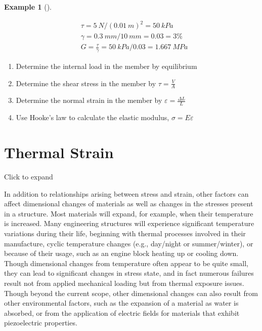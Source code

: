 \documentclass[
  letterpaper,
  DIV=11,
  numbers=noendperiod]{scrreprt}
\providecommand{\tightlist}{%
  \setlength{\itemsep}{0pt}\setlength{\parskip}{0pt}}\usepackage{longtable,booktabs,array}
\theoremstyle{definition}
\newtheorem{example}{Example}[chapter]
\theoremstyle{remark}
\begin{document}
\begin{tcolorbox}
\begin{example}[]
\begin{tcolorbox}
\[
\begin{aligned}
& \tau=5{~N} /(0.01{~m})^2=50{~kPa} \\
& \gamma=0.3{~mm}/10{~mm}=0.03=3 \% \\
& G=\frac{\tau}{\gamma}=50{~kPa}/0.03=1.667{~MPa}
\end{aligned}
\]

\end{tcolorbox}

\end{example}

\end{tcolorbox}

\begin{tcolorbox}[enhanced jigsaw, leftrule=.75mm, bottomrule=.15mm, opacityback=0, opacitybacktitle=0.6, colframe=quarto-callout-warning-color-frame, toprule=.15mm, colbacktitle=quarto-callout-warning-color!10!white, coltitle=black, bottomtitle=1mm, title={Step-by-step:}, titlerule=0mm, toptitle=1mm, colback=white, rightrule=.15mm, left=2mm, arc=.35mm, breakable]

\begin{enumerate}
\def\labelenumi{\arabic{enumi}.}
\tightlist
\item
  Determine the internal load in the member by equilibrium
\item
  Determine the shear stress in the member by \(\tau=\frac{V}{A}\)
\item
  Determine the normal strain in the member by
  \(\varepsilon=\frac{\Delta L}{L}\)
\item
  Use Hooke's law to calculate the elastic modulus,
  \(\sigma=E \varepsilon\)
\end{enumerate}

\end{tcolorbox}

\section{Thermal Strain}\label{sec-4.6}

Click to expand

In addition to relationships arising between stress and strain, other
factors can affect dimensional changes of materials as well as changes
in the stresses present in a structure. Most materials will expand, for
example, when their temperature is increased. Many engineering
structures will experience significant temperature variations during
their life, beginning with thermal processes involved in their
manufacture, cyclic temperature changes (e.g., day/night or
summer/winter), or because of their usage, such as an engine block
heating up or cooling down. Though dimensional changes from temperature
often appear to be quite small, they can lead to significant changes in
stress state, and in fact numerous failures result not from applied
mechanical loading but from thermal exposure issues. Though beyond the
current scope, other dimensional changes can also result from other
environmental factors, such as the expansion of a material as water is
absorbed, or from the application of electric fields for materials that
exhibit piezoelectric properties.
\end{document}
